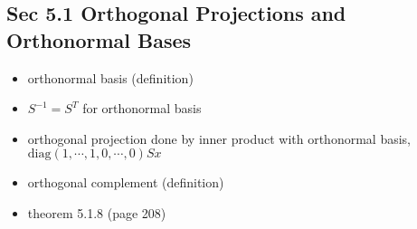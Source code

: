 \documentclass[12pt,a4paper]{article}
\begin{document}
\subsection*{Sec 5.1 Orthogonal Projections and Orthonormal Bases}
\begin{itemize}
    \item orthonormal basis (definition)
    \item $S^{-1} = S^T$ for orthonormal basis
    \item orthogonal projection done by inner product with orthonormal basis, $\mbox{diag}(1, \cdots, 1, 0, \cdots, 0)Sx$
    \item orthogonal complement (definition)
    \item theorem 5.1.8 (page 208)
\end{itemize}
\end{document}
